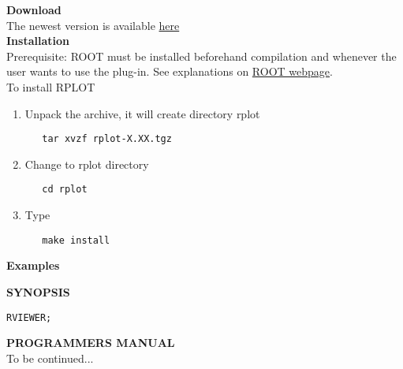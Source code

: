 \textbf{ Download } \\
The newest version is available \href{download/}{ here }\\

\textbf{ Installation }\\
Prerequisite: ROOT must be installed beforehand compilation and whenever
the user wants to use the plug-in. See explanations on
\href{http://root.cern.ch}{ROOT webpage}.  \\ 

To install RPLOT 
\begin{enumerate}
   \item  Unpack the archive, it will create directory rplot    
\begin{verbatim}
   tar xvzf rplot-X.XX.tgz
\end{verbatim}

   \item Change to rplot directory    
\begin{verbatim}
   cd rplot
\end{verbatim}

   \item Type     
\begin{verbatim}
   make install
\end{verbatim}
\end{enumerate}

\textbf{ Examples}


\textbf{SYNOPSIS}
\begin{verbatim}
RVIEWER; 
\end{verbatim}


\textbf{ PROGRAMMERS MANUAL  } \\

 To be continued... 


